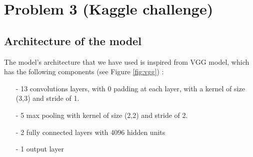 \documentclass[a4paper]{article}
\begin{document}
\newpage
\section{Problem 3 (Kaggle challenge)}
\label{sec:problem3}

\subsection{Architecture of the model}
The model's architecture that we have used is inspired from VGG model, which has the following components (see Figure \ref{fig:vgg}) :

\begin{itemize}
	\item[-] 13 convolutions layers, with 0 padding at each layer, with a kernel of size (3,3) and stride of 1.
	\item[-] 5 max pooling with kernel of size (2,2) and stride of 2.
	\item[-] 2 fully connected layers with 4096 hidden units
	\item[-] 1 output layer
\end{itemize}
\end{document}
